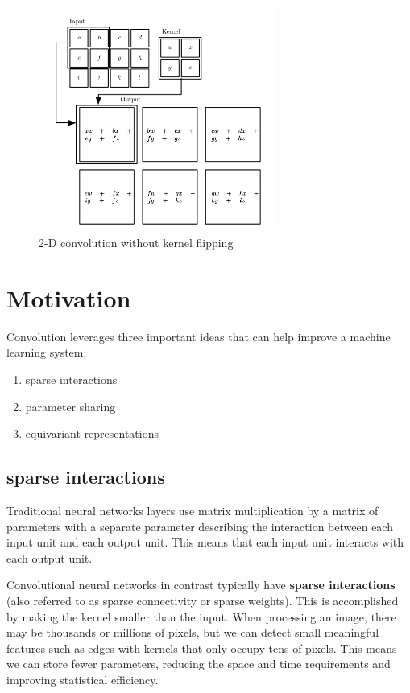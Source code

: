 \documentclass[onecolumn, letterpaper, 12pt]{report}
\begin{document}
\begin{figure}[h]
  \centering
  \includegraphics[width=0.7\textwidth]{conv_2d.png}
  \caption{2-D convolution without kernel flipping}
\end{figure}

\section{Motivation}

Convolution leverages three important ideas that can help improve a machine learning system: 

\begin{enumerate}
\item sparse interactions
\item parameter sharing
\item equivariant representations
\end{enumerate}

\subsection{sparse interactions}

Traditional neural networks layers use matrix multiplication by a matrix of parameters with a separate parameter describing the interaction between each input unit and each output unit. This means that each input unit interacts with each output unit.

Convolutional neural networks in contrast typically have \textbf{sparse interactions} (also referred to as sparse connectivity or sparse weights). This is accomplished by making the kernel smaller than the input. When processing an image, there may be thousands or millions of pixels, but we can detect small meaningful features such as edges with kernels that only occupy tens of pixels. This means we can store fewer parameters, reducing the space and time requirements and improving statistical efficiency. 
\end{document}
